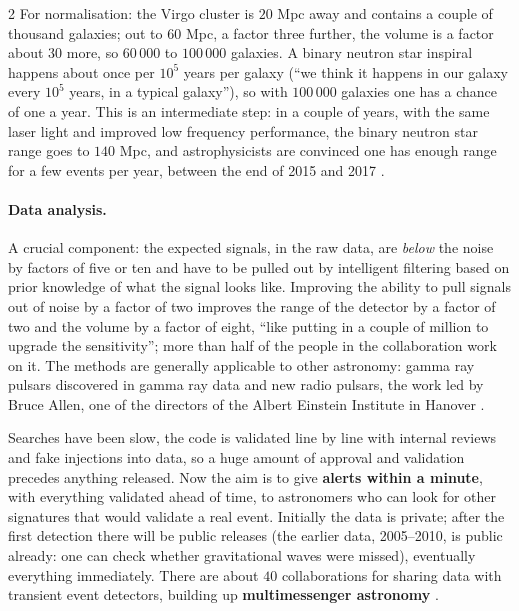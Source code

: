 \begin{paracol}{2}
For normalisation: the Virgo cluster is $20$ Mpc away and contains a couple of thousand galaxies; out to $60$ Mpc, a factor three further, the volume is a factor about $30$ more, so $60\,000$ to $100\,000$ galaxies. A binary neutron star inspiral happens about once per $10^5$ years per galaxy (``we think it happens in our galaxy every $10^5$ years, in a typical galaxy''), so with $100\,000$ galaxies one has a chance of one a year. This is an intermediate step: in a couple of years, with the same laser light and improved low frequency performance, the binary neutron star range goes to $140$ Mpc, and astrophysicists are convinced one has enough range for a few events per year, between the end of 2015 and 2017 .

\paragraph{Data analysis.} A crucial component: the expected signals, in the raw data, are \emph{below} the noise by factors of five or ten and have to be pulled out by intelligent filtering based on prior knowledge of what the signal looks like. Improving the ability to pull signals out of noise by a factor of two improves the range of the detector by a factor of two and the volume by a factor of eight, ``like putting in a couple of million to upgrade the sensitivity''; more than half of the people in the collaboration work on it. The methods are generally applicable to other astronomy: gamma ray pulsars discovered in gamma ray data and new radio pulsars, the work led by Bruce Allen, one of the directors of the Albert Einstein Institute in Hanover .

Searches have been slow, the code is validated line by line with internal reviews and fake injections into data, so a huge amount of approval and validation precedes anything released. Now the aim is to give \textbf{alerts within a minute}, with everything validated ahead of time, to astronomers who can look for other signatures that would validate a real event. Initially the data is private; after the first detection there will be public releases (the earlier data, 2005--2010, is public already: one can check whether gravitational waves were missed), eventually everything immediately. There are about $40$ collaborations for sharing data with transient event detectors, building up \textbf{multimessenger astronomy} .


\end{paracol}
